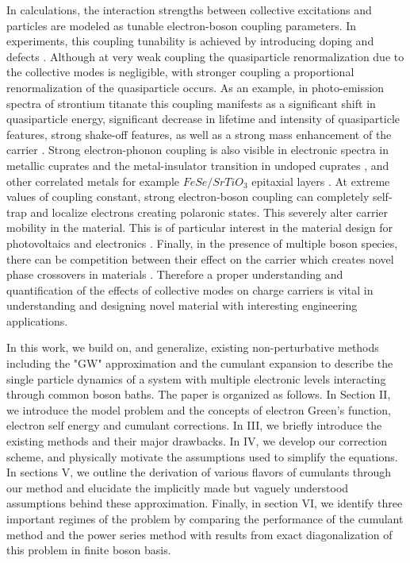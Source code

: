 \documentclass[%
 reprint,
 amsmath,amssymb,
 aps,prl,
floatfix
]{revtex4-2}
\begin{document}
In calculations, the interaction strengths between collective excitations and particles are modeled as tunable electron-boson coupling parameters. In experiments, this coupling tunability is achieved by introducing doping and defects \cite{wang_tailoring_2016, kang_holstein_2018}. Although at very weak coupling the quasiparticle renormalization due to the collective modes is negligible, with stronger coupling a proportional renormalization of the quasiparticle occurs. As an example, in photo-emission spectra of strontium titanate this coupling manifests as a significant shift in quasiparticle energy, significant decrease in lifetime and intensity of quasiparticle features, strong shake-off features, as well as a strong mass enhancement of the carrier \cite{van_mechelen_electron-phonon_2008, devreese_many-body_2010, wang2016, swartz2018, edelman2021}. Strong electron-phonon coupling is also visible in electronic spectra in metallic cuprates \cite{rosch_polaronic_2005,damascelli_angle-resolved_2003} and the metal-insulator transition in undoped cuprates \cite{baldini_electronphonon-driven_2020}, and other correlated metals for example $FeSe/SrTiO_3$ epitaxial layers \cite{yang2015}.
At extreme values of coupling constant, strong electron-boson coupling can completely self-trap and localize electrons creating polaronic states. This severely alter carrier mobility in the material. This is of particular interest in the material design for photovoltaics and electronics \cite{mohamed_electronic_2019, ma_energy_2016, hulea_tunable_2006}. Finally, in the presence of multiple boson species, there can be competition between their effect on the carrier which creates novel phase crossovers in materials \cite{riley_crossover_2018}. Therefore a proper understanding and quantification of the effects of collective modes on charge carriers is vital in understanding and designing novel material with interesting engineering applications.

 In this work, we build on, and generalize, existing non-perturbative methods including the "GW" approximation \cite{hedin_new_1965} and the cumulant expansion \cite{langreth_singularities_1970} to describe the single particle dynamics of a system with multiple electronic levels interacting through common boson baths. The paper is organized as follows. In Section II, we introduce the model problem and the concepts of electron Green's function, electron self energy and cumulant corrections. In III, we briefly introduce the existing methods and their major drawbacks. In IV, we develop our correction scheme, and physically motivate the assumptions used to simplify the equations. In sections V, we outline the derivation of various flavors of cumulants through our method and elucidate the implicitly made but vaguely understood assumptions behind these approximation. Finally, in section VI, we identify three important regimes of the problem by comparing the performance of the cumulant method and the power series method with results from exact diagonalization of this problem in finite boson basis.
\end{document}
